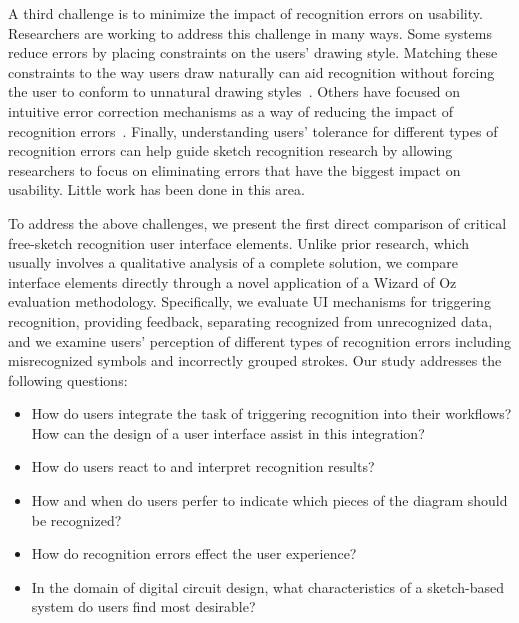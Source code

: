 \documentclass{egpubl}
\begin{document}
A third challenge is to minimize the impact of recognition errors on
usability.  Researchers are working to address this challenge in many
ways.  Some systems reduce errors by placing constraints on the users'
drawing style.  Matching these constraints to the way users draw
naturally can aid recognition without forcing the user to conform to
unnatural drawing styles~\cite{Alvarado2007Properties}.  Others have
focused on intuitive error correction mechanisms as a way of reducing
the impact of recognition errors~\cite{Mankoff2000Providing}.  Finally,
understanding users' tolerance for different types of recognition
errors can help guide sketch recognition research by allowing
researchers to focus on eliminating errors that have the biggest
impact on usability.  Little work has been done in this area.



  
To address the above challenges, we present the first direct
comparison of critical free-sketch recognition user interface
elements.  Unlike prior research, which usually involves a qualitative
analysis of a complete solution, we compare interface elements
directly through a novel application of a Wizard of Oz evaluation
methodology.  Specifically, we evaluate UI mechanisms for triggering
recognition, providing feedback, separating recognized from
unrecognized data, and we examine users' perception of different types
of recognition errors including misrecognized symbols and incorrectly
grouped strokes.  Our study addresses the following questions:
\begin{itemize}
\item How do users integrate the task of triggering recognition into
their workflows?  How can the design of a user interface assist in
this integration?
\item How do users react to and interpret recognition results?  
\item How and when do users perfer to indicate which pieces of the
  diagram should be recognized? 
\item How do recognition errors effect the user experience? 
\item In the domain of digital circuit design, what characteristics of
a sketch-based system do users find most desirable?
\end{itemize}
\end{document}
